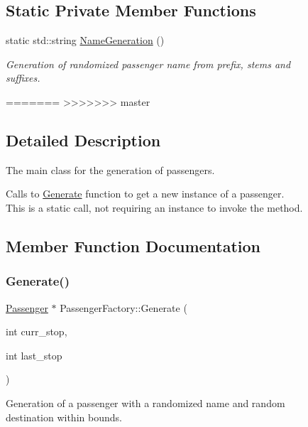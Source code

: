 \begin{figure}[H]
\begin{center}
\subsection*{Static Private Member Functions}
\begin{DoxyCompactItemize}
\item 
static std\+::string \hyperlink{classPassengerFactory_ab45108c1c01146f2b07cc5977048d540}{Name\+Generation} ()
\begin{DoxyCompactList}\small\item\em Generation of randomized passenger name from prefix, stems and suffixes. \end{DoxyCompactList}\end{DoxyCompactItemize}
=======
>>>>>>> master


\subsection{Detailed Description}
The main class for the generation of passengers. 

Calls to \hyperlink{classPassengerFactory_a2952ba78ceb285f445bc768d287230d2}{Generate} function to get a new instance of a passenger. This is a static call, not requiring an instance to invoke the method. 

\subsection{Member Function Documentation}
\mbox{\label{classPassengerFactory_a2952ba78ceb285f445bc768d287230d2}} 
\subsubsection{\texorpdfstring{Generate()}{Generate()}}
{\footnotesize\ttfamily \hyperlink{classPassenger}{Passenger} $\ast$ Passenger\+Factory\+::\+Generate (\begin{DoxyParamCaption}\item[{int}]{curr\+\_\+stop,  }\item[{int}]{last\+\_\+stop }\end{DoxyParamCaption})\hspace{0.3cm}{\ttfamily [static]}}



Generation of a passenger with a randomized name and random destination within bounds. 


\end{center}
\end{figure}
